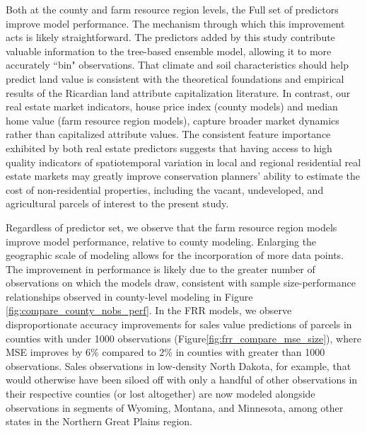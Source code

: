 \documentclass[12pt]{article}
\begin{document}
Both at the county and farm resource region levels, the Full set of predictors improve model performance. The mechanism through which this improvement acts is likely straightforward. The predictors added by this study contribute valuable information to the tree-based ensemble model, allowing it to more accurately ``bin" observations. That climate and soil characteristics should help predict land value is consistent with the theoretical foundations and empirical results of the Ricardian land attribute capitalization literature. In contrast, our real estate market indicators, house price index (county models) and median home value (farm resource region models), capture broader market dynamics rather than capitalized attribute values. The consistent feature importance exhibited by both real estate predictors suggests that having access to high quality indicators of spatiotemporal variation in local and regional residential real estate markets may greatly improve conservation planners' ability to estimate the cost of non-residential properties, including the vacant, undeveloped, and agricultural parcels of interest to the present study.

Regardless of predictor set, we observe that the farm resource region models improve model performance, relative to county modeling. Enlarging the geographic scale of modeling allows for the incorporation of more data points. The improvement in performance is likely due to the greater number of observations on which the models draw, consistent with sample size-performance relationships observed in county-level modeling in Figure \ref{fig:compare_county_nobs_perf}. In the FRR models, we observe disproportionate accuracy improvements for sales value predictions of parcels in counties with under 1000 observations (Figure\ref{fig:frr_compare_mse_size}), where MSE improves by 6\% compared to 2\% in counties with greater than 1000 observations. Sales observations in low-density North Dakota, for example, that would otherwise have been siloed off with only a handful of other observations in their respective counties (or lost altogether) are now modeled alongside observations in segments of Wyoming, Montana, and Minnesota, among other states in the Northern Great Plains region.
\end{document}
